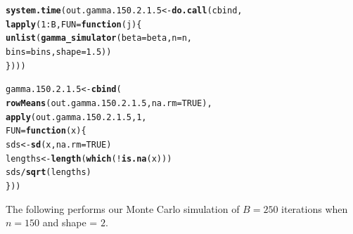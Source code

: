 \documentclass[11pt]{article}\usepackage[]{graphicx}\usepackage[]{color}
\makeatletter
\newcommand{\hlnum}[1]{\textcolor[rgb]{0.686,0.059,0.569}{#1}}%
\newcommand{\hlopt}[1]{\textcolor[rgb]{0,0,0}{#1}}%
\newcommand{\hlstd}[1]{\textcolor[rgb]{0.345,0.345,0.345}{#1}}%
\newcommand{\hlkwa}[1]{\textcolor[rgb]{0.161,0.373,0.58}{\textbf{#1}}}%
\newcommand{\hlkwb}[1]{\textcolor[rgb]{0.69,0.353,0.396}{#1}}%
\newcommand{\hlkwc}[1]{\textcolor[rgb]{0.333,0.667,0.333}{#1}}%
\newcommand{\hlkwd}[1]{\textcolor[rgb]{0.737,0.353,0.396}{\textbf{#1}}}%
\newenvironment{kframe}{%
 \def\at@end@of@kframe{}%
 \ifinner\ifhmode%
  \def\at@end@of@kframe{\end{minipage}}%
  \begin{minipage}{\columnwidth}%
 \fi\fi%
 \def\FrameCommand##1{\hskip\@totalleftmargin \hskip-\fboxsep
 \colorbox{shadecolor}{##1}\hskip-\fboxsep
     \hskip-\linewidth \hskip-\@totalleftmargin \hskip\columnwidth}%
 \MakeFramed {\advance\hsize-\width
   \@totalleftmargin\z@ \linewidth\hsize
   \@setminipage}}%
 {\par\unskip\endMakeFramed%
 \at@end@of@kframe}
\newenvironment{knitrout}{}{} %
\makeatother
\begin{document}
\begin{knitrout}
\color{fgcolor}\begin{kframe}
\begin{alltt}
\hlkwd{system.time}\hlstd{(out.gamma.150.2.1.5} \hlkwb{<-} \hlkwd{do.call}\hlstd{(cbind,}
  \hlkwd{lapply}\hlstd{(}\hlnum{1}\hlopt{:}\hlstd{B,} \hlkwc{FUN} \hlstd{=} \hlkwa{function}\hlstd{(}\hlkwc{j}\hlstd{)\{}
    \hlkwd{unlist}\hlstd{(}\hlkwd{gamma_simulator}\hlstd{(}\hlkwc{beta} \hlstd{= beta,} \hlkwc{n} \hlstd{= n,}
      \hlkwc{bins} \hlstd{= bins,} \hlkwc{shape} \hlstd{=} \hlnum{1.5}\hlstd{))}
\hlstd{\})))}
\end{alltt}


{\ttfamily\noindent\bfseries\color{errorcolor}{\#\# Error in eval(family\$initialize): non-positive values not allowed for the 'gamma' family}}

{\ttfamily\noindent\itshape\color{messagecolor}{\#\# Timing stopped at: 0.002 0 0.003}}\end{kframe}
\end{knitrout}

\begin{knitrout}
\color{fgcolor}\begin{kframe}
\begin{alltt}
\hlstd{gamma.150.2.1.5} \hlkwb{<-} \hlkwd{cbind}\hlstd{(}
  \hlkwd{rowMeans}\hlstd{(out.gamma.150.2.1.5,} \hlkwc{na.rm} \hlstd{=} \hlnum{TRUE}\hlstd{),}
  \hlkwd{apply}\hlstd{(out.gamma.150.2.1.5,} \hlnum{1}\hlstd{,}
  \hlkwc{FUN} \hlstd{=} \hlkwa{function}\hlstd{(}\hlkwc{x}\hlstd{)\{}
    \hlstd{sds} \hlkwb{<-} \hlkwd{sd}\hlstd{(x,} \hlkwc{na.rm} \hlstd{=} \hlnum{TRUE}\hlstd{)}
    \hlstd{lengths} \hlkwb{<-} \hlkwd{length}\hlstd{(}\hlkwd{which}\hlstd{(}\hlopt{!}\hlkwd{is.na}\hlstd{(x)))}
    \hlstd{sds} \hlopt{/} \hlkwd{sqrt}\hlstd{(lengths)}
  \hlstd{\}))}
\end{alltt}


{\ttfamily\noindent\bfseries\color{errorcolor}{\#\# Error in is.data.frame(x): object 'out.gamma.150.2.1.5' not found}}\end{kframe}
\end{knitrout}

The following performs our Monte Carlo simulation of $B = 250$ iterations 
when $n = 150$ and shape = $2$.
\end{document}
